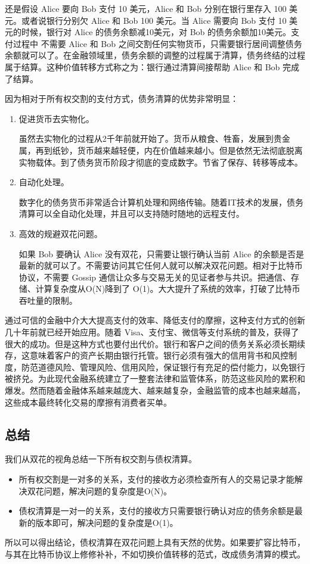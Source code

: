 还是假设 Alice 要向 Bob 支付 10 美元，Alice 和 Bob 分别在银行里存入 100 美元。或者说银行分别欠 Alice 和 Bob 100 美元。当 Alice 需要向 Bob 支付 10 美元的时候，银行对 Alice 的债务余额减10美元，对 Bob 的债务余额加10美元。支付过程中 不需要 Alice 和 Bob 之间交割任何实物货币，只需要银行居间调整债务余额就可以了。在金融领域里，债务余额的调整的过程属于清算，债务终结的过程属于结算。这种价值转移方式称之为：银行通过清算间接帮助 Alice 和 Bob 完成了结算。

因为相对于所有权交割的支付方式，债务清算的优势非常明显：

\begin{enumerate}
    \item 促进货币去实物化。
    
    虽然去实物化的过程从2千年前就开始了。货币从粮食、牲畜，发展到贵金属，再到纸钞，货币越来越轻便，内在价值越来越小。但是依然无法彻底脱离实物载体。到了债务货币阶段才彻底的变成数字。节省了保存、转移等成本。
    
    \item 自动化处理。
    
    数字化的债务货币非常适合计算机处理和网络传输。随着IT技术的发展，债务清算可以全自动化处理，并且可以支持随时随地的远程支付。
    
    \item 高效的规避双花问题。
    
    如果 Bob 要确认 Alice 没有双花，只需要让银行确认当前 Alice 的余额是否是最新的就可以了。不需要访问其它任何人就可以解决双花问题。相对于比特币协议，不需要 Gossip 通信让众多与交易无关的见证者参与共识。把通信、存储、计算复杂度从O(N)降到了 O(1)。大大提升了系统的效率，打破了比特币吞吐量的限制。
    
\end{enumerate}

通过可信的金融中介大大提高支付的效率、降低支付的摩擦，这种支付方式的创新几十年前就已经开始应用。随着 Visa、支付宝、微信等支付系统的普及，获得了很大的成功。但是这种方式也要付出代价。银行和客户之间的债务关系必须长期续存，这意味着客户的资产长期由银行托管。银行必须有强大的信用背书和风控制度，防范道德风险、管理风险、信用风险，保证银行有充足的偿付能力，以免银行被挤兑。为此现代金融系统建立了一整套法律和监管体系，防范这些风险的累积和爆发。然而随着金融体系越来越庞大、越来越复杂，金融监管的成本也越来越高，这些成本最终转化交易的摩擦有消费者买单。

\subsection{总结}

我们从双花的视角总结一下所有权交割与债权清算。

\begin{itemize}
    \item 所有权交割是一对多的关系，支付的接收方必须检查所有人的交易记录才能解决双花问题，解决问题的复杂度是O(N)。
    \item 债权清算是一对一的关系，支付的接收方只需要银行确认对应的债务余额是最新的版本即可，解决问题的复杂度是O(1)。
\end{itemize}

所以可以得出结论，债权清算在双花问题上具有天然的优势。如果要扩容比特币，与其在比特币协议上修修补补，不如切换价值转移的范式，改成债务清算的模式。
